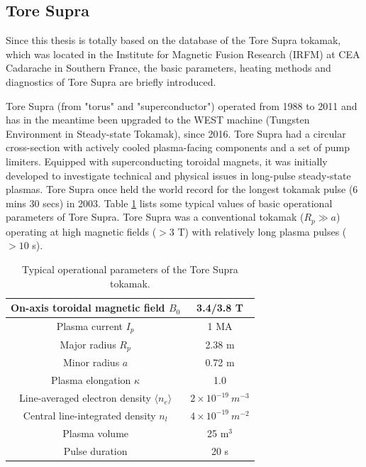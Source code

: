 \subsection{Tore Supra}

Since this thesis is totally based on the database of the Tore Supra tokamak, which was located in the Institute for Magnetic Fusion Research (IRFM) at CEA Cadarache in Southern France, the basic parameters, heating methods and diagnostics of Tore Supra are briefly introduced.


Tore Supra (from "torus" and "superconductor") operated from 1988 to 2011 and has in the meantime been upgraded to the WEST machine (Tungsten Environment in Steady-state Tokamak), since 2016. Tore Supra had a circular cross-section with actively cooled plasma-facing components and a set of pump limiters. Equipped with superconducting toroidal magnets, it was initially developed to investigate technical and physical issues in long-pulse steady-state plasmas. Tore Supra once held the world record for the longest tokamak pulse (6 mins 30 secs) in 2003. Table \ref{tab:ts_parameters} lists some typical values of basic operational parameters of Tore Supra. Tore Supra was a conventional tokamak ($R_p \gg a$) operating at high magnetic fields ($> 3$ T) with relatively long plasma pulses ($> 10$ s).


\begin{table}[h]
\begin{center}
\begin{tabular}{|c|c|}
  \hline \hline
  On-axis toroidal magnetic field $B_{0}$ & 3.4/3.8 T \\ \hline
  Plasma current $I_p$ & 1 MA \\ \hline
  Major radius $R_{p}$ & 2.38 m \\ \hline
  Minor radius $a$ & 0.72 m \\ \hline
  Plasma elongation $\kappa$ & 1.0 \\ \hline
  Line-averaged electron density $\langle{n_e}\rangle$ & $2 \times 10^{-19}\ m^{-3}$ \\ \hline
  Central line-integrated density $n_{l}$ & $4 \times 10^{-19}\ m^{-2}$ \\ \hline
  Plasma volume & 25 m$^3$ \\ \hline
  Pulse duration & 20 s \\
  \hline \hline
\end{tabular}
\caption{Typical operational parameters of the Tore Supra tokamak.}
\label{tab:ts_parameters}
\end{center}
\end{table}


